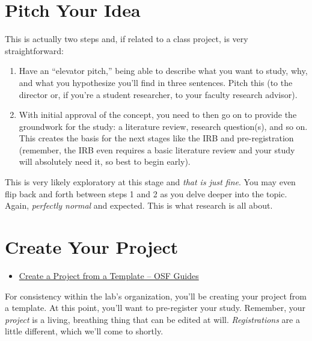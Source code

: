 \documentclass[
]{book}
\providecommand{\tightlist}{%
  \setlength{\itemsep}{0pt}\setlength{\parskip}{0pt}}
\begin{document}
\hypertarget{pitch-your-idea}{%
\section{Pitch Your Idea}\label{pitch-your-idea}}

This is actually two steps and, if related to a class project, is very straightforward:

\begin{enumerate}
\def\labelenumi{\arabic{enumi}.}
\tightlist
\item
  Have an ``elevator pitch,'' being able to describe what you want to study, why, and what you hypothesize you'll find in three sentences. Pitch this (to the director or, if you're a student researcher, to your faculty research advisor).
\item
  With initial approval of the concept, you need to then go on to provide the groundwork for the study: a literature review, research question(s), and so on. This creates the basis for the next stages like the IRB and pre-registration (remember, the IRB even requires a basic literature review and your study will absolutely need it, so best to begin early).
\end{enumerate}

This is very likely exploratory at this stage and \emph{that is just fine}. You may even flip back and forth between steps 1 and 2 as you delve deeper into the topic. Again, \emph{perfectly normal} and expected. This is what research is all about.

\hypertarget{create-your-project}{%
\section{Create Your Project}\label{create-your-project}}

\begin{itemize}
\tightlist
\item
  \href{https://help.osf.io/hc/en-us/articles/360019930093-Create-a-Project-from-a-Template\#Use-a-public-project-as-a-template}{Create a Project from a Template -- OSF Guides}
\end{itemize}

For consistency within the lab's organization, you'll be creating your project from a template. At this point, you'll want to pre-register your study. Remember, your \emph{project} is a living, breathing thing that can be edited at will. \emph{Registrations} are a little different, which we'll come to shortly.
\end{document}
